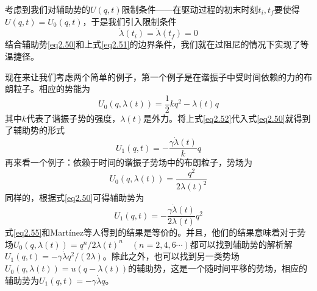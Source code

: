 考虑到我们对辅助势的$U(q,t)$限制条件——在驱动过程的初末时刻$t_i , t_f$要使得$U(q,t)=U_0 (q,t)$，于是我们引入限制条件
\begin{equation}
    \dot{\lambda}(t_i)=\dot{\lambda}(t_f)=0
    \label{eq2.51}
\end{equation}
结合辅助势\eqref{eq2.50}和上式\eqref{eq2.51}的边界条件，我们就在过阻尼的情况下实现了等温捷径。

现在来让我们考虑两个简单的例子，第一个例子是在谐振子中受时间依赖的力的布朗粒子。相应的势能为
\begin{equation}
    U_{0}(q, \lambda(t))=\frac{1}{2} k q^{2}-\lambda(t) q
    \label{eq2.52}
\end{equation}
其中$k$代表了谐振子势的强度，$\lambda(t)$是外力。将上式\eqref{eq2.52}代入式\eqref{eq2.50}就得到了辅助势的形式
\begin{equation}
    U_{1}(q, t)=-\frac{\gamma \dot{\lambda}(t)}{k} q
    \label{eq2.53}
\end{equation}
再来看一个例子：依赖于时间的谐振子势场中的布朗粒子，势场为
\begin{equation}
    U_{0}(q, \lambda(t))=\frac{q^2}{2 \lambda(t)^2}
    \label{eq2.54}
\end{equation}
同样的，根据式\eqref{eq2.50}可得辅助势为
\begin{equation}
    U_{1}(q, t)=-\frac{\gamma \dot{\lambda}(t)}{2 \lambda(t)} q^{2}
    \label{eq2.55}
\end{equation}
式\eqref{eq2.55}和Martínez等人得到的结果\cite{Martinez2016}是等价的。并且，他们的结果意味着对于势场$U_0 (q, \lambda(t))= q^{n} / 2 \lambda(t)^n   \quad (n=2,4,6\cdots)$都可以找到辅助势的解析解$U_{1}(q, t)=- \gamma \dot{\lambda} q^{2} /(2  \lambda)$。除此之外，也可以找到另一类势场$U_{0}(q, \lambda(t))=u(q-\lambda(t))$的辅助势\cite{Li2016}，这是一个随时间平移的势场，相应的辅助势为$U_{1}(q, t)=-\gamma \dot{\lambda} q$。


